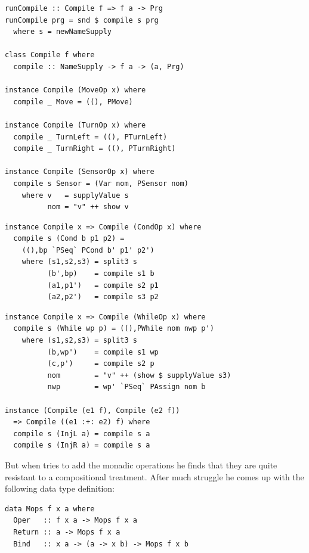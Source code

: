 \begin{small}
\begin{verbatim}
runCompile :: Compile f => f a -> Prg
runCompile prg = snd $ compile s prg
  where s = newNameSupply 

class Compile f where
  compile :: NameSupply -> f a -> (a, Prg)

instance Compile (MoveOp x) where
  compile _ Move = ((), PMove) 

instance Compile (TurnOp x) where
  compile _ TurnLeft = ((), PTurnLeft)
  compile _ TurnRight = ((), PTurnRight)

instance Compile (SensorOp x) where
  compile s Sensor = (Var nom, PSensor nom)
    where v   = supplyValue s
          nom = "v" ++ show v
\end{verbatim}
\pagebreak
\begin{verbatim}
instance Compile x => Compile (CondOp x) where
  compile s (Cond b p1 p2) = 
    ((),bp `PSeq` PCond b' p1' p2') 
    where (s1,s2,s3) = split3 s
          (b',bp)    = compile s1 b
          (a1,p1')   = compile s2 p1
          (a2,p2')   = compile s3 p2 
\end{verbatim}
\end{small}
\begin{small}
\begin{verbatim}
instance Compile x => Compile (WhileOp x) where
  compile s (While wp p) = ((),PWhile nom nwp p')
    where (s1,s2,s3) = split3 s
          (b,wp')    = compile s1 wp
          (c,p')     = compile s2 p
          nom        = "v" ++ (show $ supplyValue s3)
          nwp        = wp' `PSeq` PAssign nom b

instance (Compile (e1 f), Compile (e2 f)) 
  => Compile ((e1 :+: e2) f) where
  compile s (InjL a) = compile s a
  compile s (InjR a) = compile s a 
\end{verbatim}
\end{small}

But when \studname{} tries to add the monadic operations he finds that
they are quite resistant to a compositional treatment. After much
struggle he comes up with the following data type definition:

\begin{small}
\begin{verbatim}
data Mops f x a where
  Oper   :: f x a -> Mops f x a
  Return :: a -> Mops f x a
  Bind   :: x a -> (a -> x b) -> Mops f x b
\end{verbatim}
\end{small}

